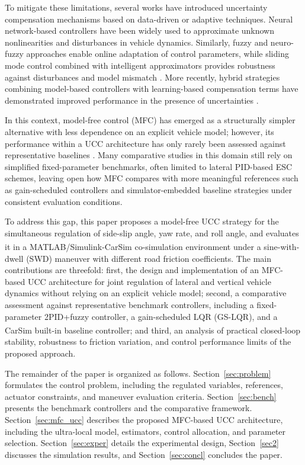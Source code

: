 \documentclass[sn-chicago,iicol]{sn-jnl}
\theoremstyle{thmstyleone}%
\theoremstyle{thmstyletwo}%
\theoremstyle{thmstylethree}%
\begin{document}
To mitigate these limitations, several works have introduced uncertainty compensation mechanisms 
based on data-driven or adaptive techniques. Neural network-based controllers have been widely 
used to approximate unknown nonlinearities and disturbances in vehicle dynamics. Similarly, fuzzy 
and neuro-fuzzy approaches enable online adaptation of control parameters, while sliding mode 
control combined with intelligent approximators provides robustness against disturbances and model 
mismatch \citep{electronics10040510,Guo2021}. More recently, hybrid strategies combining 
model-based controllers with learning-based compensation terms have demonstrated improved 
performance in the presence of uncertainties \citep{levine2016end}.

 In this context, model-free control (MFC) has emerged as a structurally simpler alternative with less dependence on an explicit vehicle model; however, its performance within a UCC architecture has only rarely been assessed against representative baselines \citep{SanchezMorales2023,Mazzilli2021}. Many comparative studies in this domain still rely on simplified fixed-parameter benchmarks, often limited to lateral PID-based ESC schemes, leaving open how MFC compares with more meaningful references such as gain-scheduled controllers and simulator-embedded baseline strategies under consistent evaluation conditions.
 
 To address this gap, this paper proposes a model-free UCC strategy for the simultaneous regulation of side-slip angle, yaw rate, and roll angle, and evaluates it in a MATLAB/Simulink\textsuperscript{\textregistered}-CarSim\textsuperscript{\textregistered} co-simulation environment under a sine-with-dwell (SWD) maneuver with different road friction coefficients. The main contributions are threefold: first, the design and implementation of an MFC-based UCC architecture for joint regulation of lateral and vertical vehicle dynamics without relying on an explicit vehicle model; second, a comparative assessment against representative benchmark controllers, including a fixed-parameter 2PID+fuzzy controller, a gain-scheduled LQR (GS-LQR), and a CarSim\textsuperscript{\textregistered} built-in baseline controller; and third, an analysis of practical closed-loop stability, robustness to friction variation, and control performance limits of the proposed approach.

The remainder of the paper is organized as follows. Section~\ref{sec:problem} formulates the control problem, including the regulated variables, references, actuator constraints, and maneuver evaluation criteria. Section~\ref{sec:bench} presents the benchmark controllers and the comparative framework. Section~\ref{sec:mfc_ucc} describes the proposed MFC-based UCC architecture, including the ultra-local model, estimators, control allocation, and parameter selection. Section~\ref{sec:exper} details the experimental design, Section~\ref{sec2} discusses the simulation results, and Section~\ref{sec:concl} concludes the paper.
\end{document}
